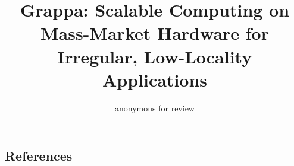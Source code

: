 



\title{Grappa: Scalable Computing on Mass-Market Hardware for Irregular, Low-Locality Applications}
\author{anonymous for review}

\maketitle
\begin{abstract}

\end{abstract}












\subsection{References}





